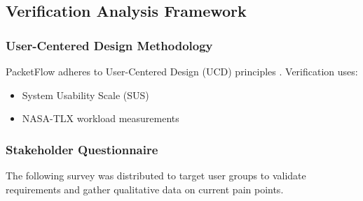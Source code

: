 \documentclass[
    11pt, 
    a4paper, 
    parskip=half, 
    headsepline,       %
    DIV=12             %
]{scrartcl}
\begin{document}
\subsection{Verification Analysis Framework}

\subsubsection{User-Centered Design Methodology}
PacketFlow adheres to User-Centered Design (UCD) principles \cite{ref59}. Verification uses:
\begin{itemize}
    \item System Usability Scale (SUS) \cite{ref60}
    \item NASA-TLX workload measurements \cite{ref61}
\end{itemize}

\subsubsection{Stakeholder Questionnaire}
The following survey was distributed to target user groups to validate requirements and gather qualitative data on current pain points.
\end{document}
